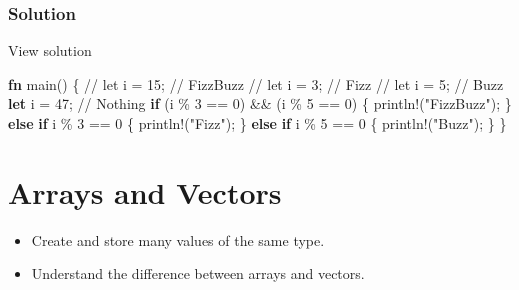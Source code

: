 \documentclass[
  letterpaper,
  DIV=11,
  numbers=noendperiod,
  oneside]{scrreprt}
\newenvironment{Shaded}{\begin{snugshade}}{\end{snugshade}}
\newcommand{\CommentTok}[1]{\textcolor[rgb]{0.37,0.37,0.37}{#1}}
\newcommand{\ControlFlowTok}[1]{\textcolor[rgb]{0.00,0.23,0.31}{\textbf{#1}}}
\newcommand{\DecValTok}[1]{\textcolor[rgb]{0.68,0.00,0.00}{#1}}
\newcommand{\KeywordTok}[1]{\textcolor[rgb]{0.00,0.23,0.31}{\textbf{#1}}}
\newcommand{\NormalTok}[1]{\textcolor[rgb]{0.00,0.23,0.31}{#1}}
\newcommand{\OperatorTok}[1]{\textcolor[rgb]{0.37,0.37,0.37}{#1}}
\newcommand{\PreprocessorTok}[1]{\textcolor[rgb]{0.68,0.00,0.00}{#1}}
\newcommand{\StringTok}[1]{\textcolor[rgb]{0.13,0.47,0.30}{#1}}
\providecommand{\tightlist}{%
  \setlength{\itemsep}{0pt}\setlength{\parskip}{0pt}}\usepackage{longtable,booktabs,array}
\begin{document}
\subsection{Solution}\label{solution-1}

View solution

\begin{Shaded}
\begin{Highlighting}[]
\KeywordTok{fn}\NormalTok{ main() }\OperatorTok{\{}
    \CommentTok{// let i = 15; // FizzBuzz}
    \CommentTok{// let i = 3; // Fizz}
    \CommentTok{// let i = 5; // Buzz}
    \KeywordTok{let}\NormalTok{ i }\OperatorTok{=} \DecValTok{47}\OperatorTok{;} \CommentTok{// Nothing}
    \ControlFlowTok{if}\NormalTok{ (i }\OperatorTok{\%} \DecValTok{3} \OperatorTok{==} \DecValTok{0}\NormalTok{) }\OperatorTok{\&\&}\NormalTok{ (i }\OperatorTok{\%} \DecValTok{5} \OperatorTok{==} \DecValTok{0}\NormalTok{) }\OperatorTok{\{}
        \PreprocessorTok{println!}\NormalTok{(}\StringTok{"FizzBuzz"}\NormalTok{)}\OperatorTok{;}
    \OperatorTok{\}} \ControlFlowTok{else} \ControlFlowTok{if}\NormalTok{ i }\OperatorTok{\%} \DecValTok{3} \OperatorTok{==} \DecValTok{0} \OperatorTok{\{}
        \PreprocessorTok{println!}\NormalTok{(}\StringTok{"Fizz"}\NormalTok{)}\OperatorTok{;}
    \OperatorTok{\}} \ControlFlowTok{else} \ControlFlowTok{if}\NormalTok{ i }\OperatorTok{\%} \DecValTok{5} \OperatorTok{==} \DecValTok{0} \OperatorTok{\{}
        \PreprocessorTok{println!}\NormalTok{(}\StringTok{"Buzz"}\NormalTok{)}\OperatorTok{;}
    \OperatorTok{\}}
\OperatorTok{\}}
\end{Highlighting}
\end{Shaded}

\chapter{Arrays and Vectors}\label{arrays-and-vectors}

\begin{tcolorbox}[enhanced jigsaw, titlerule=0mm, coltitle=black, opacitybacktitle=0.6, bottomrule=.15mm, bottomtitle=1mm, colframe=quarto-callout-tip-color-frame, toprule=.15mm, opacityback=0, rightrule=.15mm, leftrule=.75mm, breakable, left=2mm, colback=white, colbacktitle=quarto-callout-tip-color!10!white, toptitle=1mm, title=\textcolor{quarto-callout-tip-color}{\faLightbulb}\hspace{0.5em}{Objective}, arc=.35mm]

\begin{itemize}
\tightlist
\item
  Create and store many values of the same type.
\item
  Understand the difference between arrays and vectors.
\end{itemize}

\end{tcolorbox}
\end{document}
